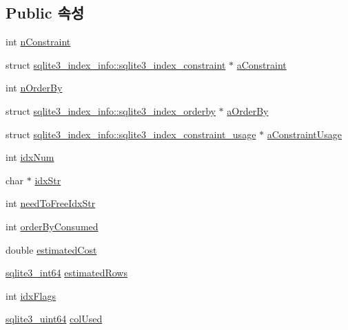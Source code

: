 \subsection*{Public 속성}
\begin{DoxyCompactItemize}
\item 
int \hyperlink{structsqlite3__index__info_ae861993a30ce914a5214eab2579d935a}{n\+Constraint}
\item 
struct \hyperlink{structsqlite3__index__info_1_1sqlite3__index__constraint}{sqlite3\+\_\+index\+\_\+info\+::sqlite3\+\_\+index\+\_\+constraint} $\ast$ \hyperlink{structsqlite3__index__info_a634aa93834e2b47acf34454746c0f248}{a\+Constraint}
\item 
int \hyperlink{structsqlite3__index__info_a3ef850fdc57eddbc8189fe84d0a9044e}{n\+Order\+By}
\item 
struct \hyperlink{structsqlite3__index__info_1_1sqlite3__index__orderby}{sqlite3\+\_\+index\+\_\+info\+::sqlite3\+\_\+index\+\_\+orderby} $\ast$ \hyperlink{structsqlite3__index__info_a6823a68979e19d8e332389361e920ef9}{a\+Order\+By}
\item 
struct \hyperlink{structsqlite3__index__info_1_1sqlite3__index__constraint__usage}{sqlite3\+\_\+index\+\_\+info\+::sqlite3\+\_\+index\+\_\+constraint\+\_\+usage} $\ast$ \hyperlink{structsqlite3__index__info_a79b8a969dd7d582fc2ea3c0fbc5adb56}{a\+Constraint\+Usage}
\item 
int \hyperlink{structsqlite3__index__info_afcee17707a1c147fbd55c23c807fdae3}{idx\+Num}
\item 
char $\ast$ \hyperlink{structsqlite3__index__info_a1a9935e997bd6e3cce048534da7506a7}{idx\+Str}
\item 
int \hyperlink{structsqlite3__index__info_a5410066c067c3891cdf165c70cc4d6b1}{need\+To\+Free\+Idx\+Str}
\item 
int \hyperlink{structsqlite3__index__info_a5515d9de0f37f68d7e0930c20a668b29}{order\+By\+Consumed}
\item 
double \hyperlink{structsqlite3__index__info_aa8b4fe1d2ee38aab57ba5e1da00d7830}{estimated\+Cost}
\item 
\hyperlink{sqlite3_8h_a0a4d3e6c1ad46f90e746b920ab6ca0d2}{sqlite3\+\_\+int64} \hyperlink{structsqlite3__index__info_adcdf25dcf9848a6fedf539bb9c921b7f}{estimated\+Rows}
\item 
int \hyperlink{structsqlite3__index__info_a8acf2a7efbc3e193cf01d2afbd44fdbb}{idx\+Flags}
\item 
\hyperlink{sqlite3_8h_a181c20ecfd72bc6627635746d382c610}{sqlite3\+\_\+uint64} \hyperlink{structsqlite3__index__info_a99787169e2f78c0728bdb339c4107a2e}{col\+Used}
\end{DoxyCompactItemize}


